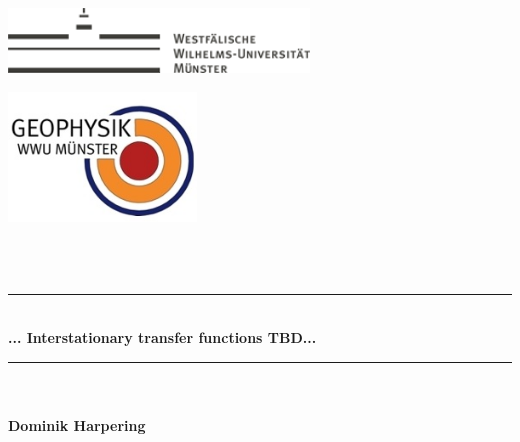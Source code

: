 \begin{titlepage}
\date{}
\begin{center}


\begin{minipage}[hbt]{5cm}
	\centering
	\includegraphics[width=8cm]{bilder/wwu_logo.png}
	\label{wwu_logo}
\end{minipage}
\hfill
\begin{minipage}[hbt]{5cm}
	\centering
	\includegraphics[width=5cm]{bilder/logo-willkommen.jpg}
	\label{geo_logo}
\end{minipage}
\\[1cm]

\text{ }\\[1.5cm]


\newcommand{\HRule}{\rule{0.9\textwidth}{0.5mm}}
\HRule \\[0.4cm]
{ \huge \bfseries ... Interstationary transfer functions TBD...}\\[0.4cm]

\HRule \\[2.5cm]

\LARGE
{} \\[1cm]
\textbf{Dominik Harpering} \\[1cm]
 \\
\\[3cm]
\\[3cm]
\\

\end{center}

\end{titlepage}